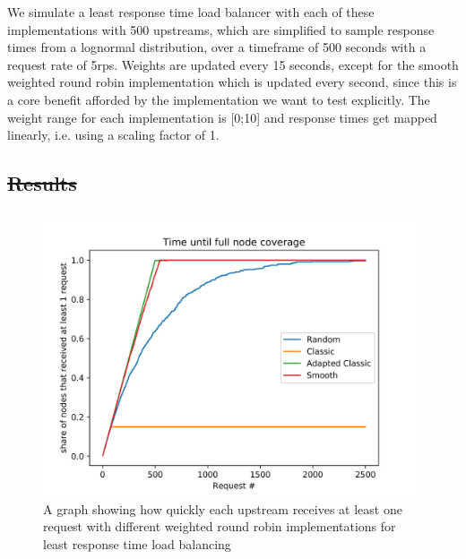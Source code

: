 \documentclass[draft,final]{vutinfth} %
\providecommand{\DIFaddtex}[1]{{\protect\color{blue}\uwave{#1}}} %
\providecommand{\DIFdeltex}[1]{{\protect\color{red}\sout{#1}}}                      %
\providecommand{\DIFaddbegin}{} %
\providecommand{\DIFaddend}{} %
\providecommand{\DIFdelbegin}{} %
\providecommand{\DIFdelend}{} %
\providecommand{\DIFadd}[1]{\texorpdfstring{\DIFaddtex{#1}}{#1}} %
\providecommand{\DIFdel}[1]{\texorpdfstring{\DIFdeltex{#1}}{}} %
\begin{document}
We simulate a least response time load balancer with each of these implementations with 500 upstreams, which are simplified to sample response times from a lognormal distribution, over a timeframe of 500 seconds with a request rate of 5\gls{rps}.
Weights are updated every 15 seconds, except for the smooth weighted round robin implementation which is updated every second, since this is a core benefit afforded by the implementation we want to test explicitly.
The weight range for each implementation is [0;10] and response times get mapped linearly, i.e. using a scaling factor of 1.

\DIFdelbegin \subsection{\DIFdel{Results}}
\addtocounter{subsection}{-1}%
\DIFdelend \DIFaddbegin \subsubsection{\DIFadd{Results}}
\DIFaddend 

\begin{figure}
    \centering
    \includegraphics[width=11cm]{graphics/graphs/lb_imp_upstream_coverage.png}
    \caption{A graph showing how quickly each upstream receives at least one request with different weighted round robin implementations for least response time load balancing}
    \label{fig:lb_imp_upstream_coverage}
\end{figure}
\end{document}
